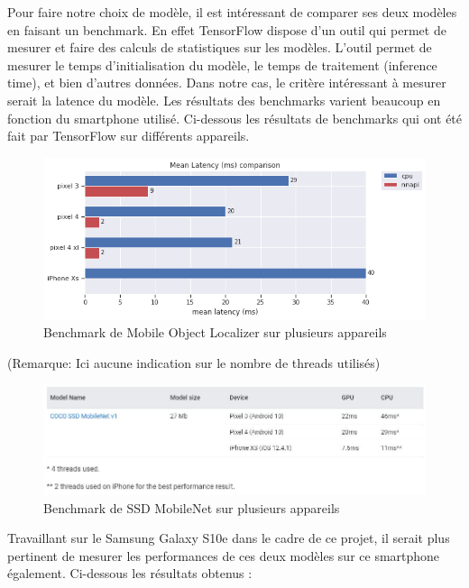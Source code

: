 \documentclass[UTF8]{EPURapport}
\begin{document}
Pour faire notre choix de modèle, il est intéressant de comparer ses deux modèles en faisant un benchmark. En effet TensorFlow dispose d'un outil qui permet de mesurer et faire des calculs de statistiques sur les modèles. L'outil permet de mesurer le temps d'initialisation du modèle, le temps de traitement (inference time), et bien d'autres données. Dans notre cas, le critère intéressant à mesurer serait la latence du modèle. Les résultats des benchmarks varient beaucoup en fonction du smartphone utilisé. Ci-dessous les résultats de benchmarks qui ont été fait par TensorFlow sur différents appareils.

\begin{figure}[h!]
\centering
  \includegraphics[width=\textwidth]{images/bench_mol.png}
  \caption{Benchmark de Mobile Object Localizer sur plusieurs appareils}
  \label{fig:benchmol}
\end{figure}

(Remarque: Ici aucune indication sur le nombre de threads utilisés)

\begin{figure}[h!]
\centering
  \includegraphics[width=\textwidth]{images/bench_ssd_mobilenet.jpg}
  \caption{Benchmark de SSD MobileNet sur plusieurs appareils}
  \label{fig:benchssdmobilenet}
\end{figure}

Travaillant sur le Samsung Galaxy S10e dans le cadre de ce projet, il serait plus pertinent de mesurer les performances de ces deux modèles sur ce smartphone également. Ci-dessous les résultats obtenus :
\newpage
\end{document}
